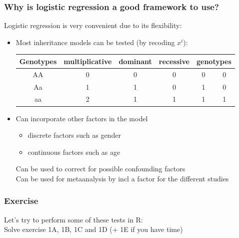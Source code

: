 \documentclass[xcolor=pdftex,dvipsnames,table,10pt]{beamer}
\begin{document}
\begin{frame}
  \frametitle{Why is logistic regression a good framework to use?}
    \vspace{-.3cm}
\small \hspace{0.3cm}Logistic regression is very convenient due to its flexibility:\\\vspace{0.05cm}
 \begin{itemize}
 \item Most inheritance models can be tested (by recoding $x^i$): %
 \begin{table}
    \begin{tabular}{c|ccccc}
\hline
\multicolumn{1}{l}{Genotypes} & \multicolumn{1}{c}{multiplicative} & \multicolumn{1}{c}{dominant} & \multicolumn{1}{c}{recessive} & \multicolumn{2}{c}{genotypes}\\
\hline
AA & 0 & 0 & 0 & 0 & 0 \\
Aa & 1 & 1 & 0 & 1 & 0 \\
aa & 2 & 1 & 1 & 1 & 1 \\
\hline
    \end{tabular}
  \end{table}
 \item<2-> Can incorporate other factors in the model
   \begin{itemize}
    \item discrete factors such as gender
    \item continuous factors such as age
    \end{itemize}
    Can be used to correct for possible confounding factors\\
    Can be used for metaanalysis by incl a factor for the different studies
  \end{itemize}
\end{frame}

\begin{frame}
\frametitle{Exercise}
\small
Let's try to perform some of these tests in R:\\\vspace{0.3cm}
Solve exercise 1A, 1B, 1C and 1D (+ 1E if you have time)\\ 
\end{frame}
\end{document}
